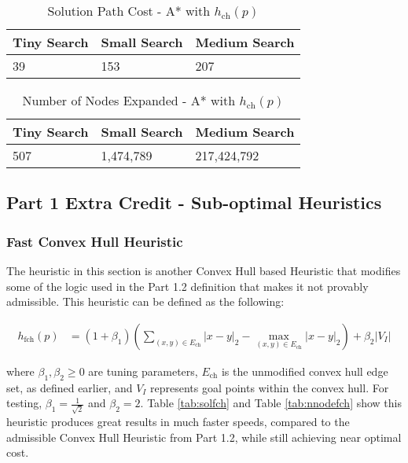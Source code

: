 \documentclass{article}[12pt]
\begin{document}
\begin{table}[ht]
   \centering
   \begin{tabular}{l | l | l  }
   \hline
    Tiny Search & Small Search & Medium Search\\
    \hline \hline 
   39 & 153 & 207 \\
   \hline
   \end{tabular}
   \caption{Solution Path Cost - A* with $h_{\text{ch}}(p)$} \label{tab:sol12}
   \end{table}
   
   \begin{table}[ht]
   \centering
   \begin{tabular}{l | l | l  }
   \hline
    Tiny Search & Small Search & Medium Search\\
    \hline \hline 
   507 & 1,474,789 &  217,424,792\\
   \hline
   \end{tabular}
   \caption{Number of Nodes Expanded - A* with $h_{\text{ch}}(p)$} \label{tab:nnode12}
   \end{table}

   \newpage
   \subsection{Part 1 Extra Credit - Sub-optimal Heuristics}
   \subsubsection{Fast Convex Hull Heuristic}
   The heuristic in this section is another Convex Hull based Heuristic that modifies some of the logic used in the Part 1.2 definition that makes it not provably admissible. This heuristic can be defined as the following:
   
   \begin{align*}
   h_{\text{fch}}(p) &= \left(1 + \beta_1 \right) \left( \sum_{ (x,y) \in E_{\text{ch}} } |x - y|_2 - \max_{ (x,y) \in E_{\text{ch}} } |x - y|_2 \right) + \beta_2 |V_I|
   \end{align*}
   
   where $\beta_1, \beta_2 \geq 0$ are tuning parameters, $E_{\text{ch}}$ is the unmodified convex hull edge set, as defined earlier, and $V_I$ represents goal points within the convex hull. For testing, $\beta_1 = \frac{1}{\sqrt{2}}$ and $\beta_2 = 2$. Table \ref{tab:solfch} and Table \ref{tab:nnodefch} show this heuristic produces great results in much faster speeds, compared to the admissible Convex Hull Heuristic from Part 1.2, while still achieving near optimal cost.
   
\end{document}
